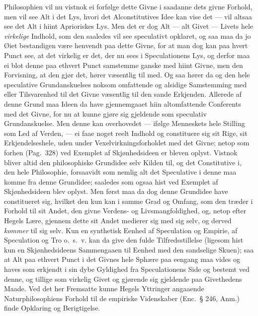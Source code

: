 \documentclass[12pt,a4paper]{book}
\newcommand{\apage}[1]{\marginnote{\footnotesize\textit{[#1]}}}
\begin{document}
Philosophien vil nu vistnok ei forfølge dette Givne i saadanne dets
givne Forhold, men vil see Alt i det Lys, hvori det Alconstitutives
Idee kan vise det --- vil altsaa see det Alt i hiint Aprioriskes Lys.
Men det er dog Alt --- alt Givet --- Livets hele \emph{virkelige} Indhold, som
den saaledes vil see speculativt opklaret, og saa maa da jo Øiet
bestandigen være henvendt paa dette Givne, for at man dog kan paa hvert
Punct see, at det virkelig er det, der nu sees i Speculationens Lys, og
derfor maa ei blot denne paa ethvert Punct samstemme ganske med hiint
Givne, men den Forvisning, at den gjør det, hører væsentlig til med. Og
saa hører da og den hele speculative Grundanskuelses noksom omfattende
og alsidige Samstemming med eller Tilsvarenhed til det Givne væsentlig
til den sande Erkjenden. Allerede af denne Grund maa Ideen da have
gjennemgaaet hiin altomfattende Conferents med det Givne, for nu at
kunne gjøre sig gjeldende som speculativ Grundanskuelse. Men denne kan
overhovedet --- ifølge Menneskets hele Stilling som Led af Verden, ---
ei faae noget reelt Indhold og constituere sig sit Rige, sit
Erkjendelseshele, uden under Vexelvirkningsforholdet med det Givne;
netop som forhen (Pag.\ 328) ved Exemplet af Skjønhedsideen er bleven
oplyst. Vistnok bliver altid den philosophiske Grundidee selv Kilden
til, og \apage{69} det Constitutive i, den hele Philosophie, forsaavidt som nemlig
alt det Speculative i denne maa komme fra denne Grundidee; saaledes som
ogsaa hist ved Exemplet af Skjønhedsideen blev oplyst. Men først maa da
dog denne Grundidee have constitueret sig, hvilket den kun kan i samme
Grad og Omfang, som den træder i Forhold til sit Andet, den givne
Verdens- og Livsmangfoldighed, og, netop efter Hegels Lære, gjennem
dette sit Andet medierer sig med sig selv, og derved \emph{kommer} til sig
selv. Kun en synthetisk Eenhed af Speculation og Empirie, af
Speculation og Tro o.\ s.\ v. kan da give den fulde Tilfredsstillelse
(ligesom hist kun en Skjønhedsideens Sammengaaen til Eenhed med den
sandselige Skuen); saa at Alt paa ethvert Punct i det Givnes hele
Sphære paa eengang maa vides og haves som erkjendt i sin dybe Gyldighed
fra Speculationens Side og bestemt ved denne, og tillige som virkelig
Givet og gjørende sig gjeldende paa Givethedens Maade. Ved det her
Fremsatte kunne Hegels Yttringer angaaende Naturphilosophiens Forhold
til de empiriske Videnskaber (Enc.\ § 246, Anm.) finde Opklaring og
Berigtigelse.
\end{document}
